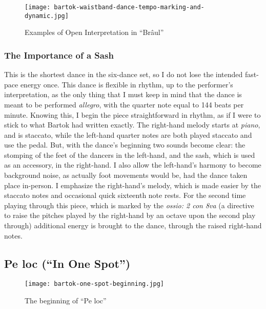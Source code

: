 \begin{figure}[h]
  \centering
  \texttt{[image: bartok-waistband-dance-tempo-marking-and-dynamic.jpg]}
  \caption[An example of the open interpretation in ``Brâul'' of Bartok's \textit{Six Romanian Folk Dances}, Sz. 56, BB 68]{Examples of Open Interpretation in ``Brâul''}
  \label{fig:bartok-waistband-dance-interpretation}
\end{figure}

\subsubsection{The Importance of a Sash}

This is the shortest dance in the six-dance set, so I do not lose the intended fast-pace energy once. This dance is flexible in rhythm, up to the performer's interpretation, as the only thing that I must keep in mind that the dance is meant to be performed \textit{allegro}, with the quarter note equal to 144 beats per minute. Knowing this, I begin the piece straightforward in rhythm, as if I were to stick to what Bartok had written exactly. The right-hand melody starts at \textit{piano}, and is staccato, while the left-hand quarter notes are both played staccato and use the pedal. But, with the dance's beginning two sounds become clear: the stomping of the feet of the dancers in the left-hand, and the sash, which is used as an accessory, in the right-hand. I also allow the left-hand's harmony to become background noise, as actually foot movements would be, had the dance taken place in-person. I emphasize the right-hand's melody, which is made easier by the staccato notes and occasional quick sixteenth note rests. For the second time playing through this piece, which is marked by the \textit{ossio: 2 con 8va} (a directive to raise the pitches played by the right-hand by an octave upon the second play through) additional energy is brought to the dance, through the raised right-hand notes. 


\subsection{Pe loc (``In One Spot'')}

\begin{figure}
  \centering
  \texttt{[image: bartok-one-spot-beginning.jpg]}
  \caption[The beginning of ``Pe loc'', in Bartok's \textit{Six Romanian Folk Dances}, Sz. 56, BB 68]{The beginning of ``Pe loc''}  
  \label{fig:bartok-one-spot-beginning}
\end{figure}

